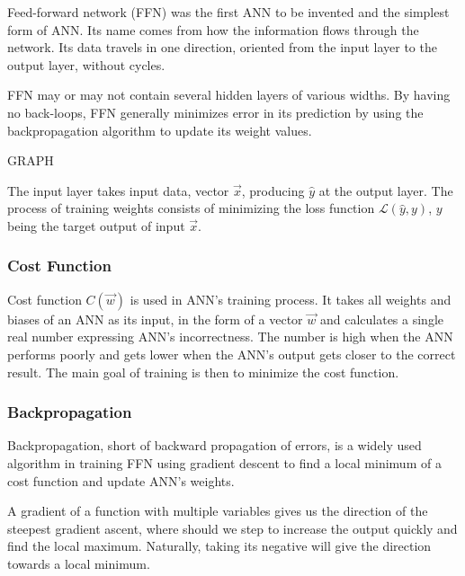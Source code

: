 Feed-forward network (FFN) was the first ANN to be invented and the simplest form of ANN. Its name comes from how the information flows through the network. Its data travels in one direction, oriented from the input layer to the output layer, without cycles.\cite{ffnbrilliant} 

FFN may or may not contain several hidden layers of various widths. By having no back-loops, FFN generally minimizes error in its prediction by using the backpropagation algorithm to update its weight values.\cite{mainTypesANN}

GRAPH

The input layer takes input data, vector $\vec{x}$, producing $\hat{y}$ at the output layer. The process of training weights
 consists of minimizing the loss function $\mathcal{L}(\hat{y},y)$, $y$ being the target output of input $\vec{x}$.\cite{lipton2015critical}


\subsubsection{Cost Function}
Cost function $C(\vec{w})$ is used in ANN's training process. It takes all weights and biases of an ANN as its input, in the form of a vector $\vec{w}$ and calculates a single real number expressing ANN's incorrectness.\cite{Goodfellow-et-al-2016} The number is high when the ANN performs poorly and gets lower when the ANN's output gets closer to the correct result. The main goal of training is then to minimize the cost function. 

\subsubsection{Backpropagation}
Backpropagation, short of backward propagation of errors, is a widely used algorithm in training FFN using gradient descent to find a local minimum of a cost function and update ANN's weights.\cite{birlliantbackprop}

A gradient of a function with multiple variables gives us the direction of the steepest gradient ascent, where should we step to increase the output quickly and find the local maximum. Naturally, taking its negative will give the direction towards a local minimum. 

